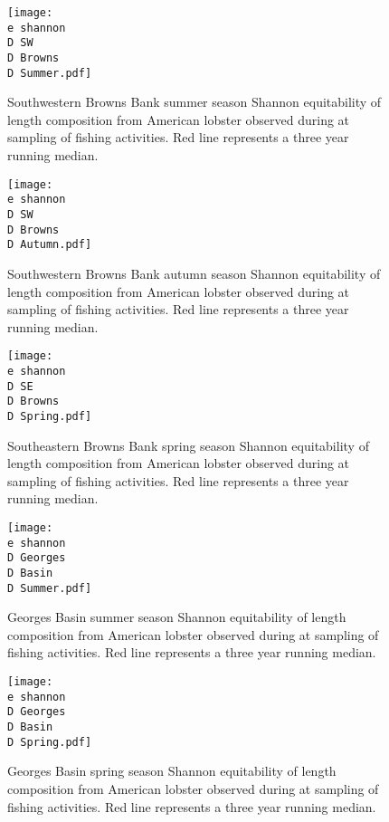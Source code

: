\documentclass[11pt]{article}
\newcommand{\D}{.}
\newcommand{\e}{/backup/bio_data/bio.lobster/figures/} %
\begin{document}
\clearpage



\begin{figure}

    \texttt{[image: \\e shannon\\D SW\\D Browns\\D Summer.pdf]}
    \caption{Southwestern Browns Bank summer season Shannon equitability of length composition from American lobster observed during at sampling of fishing activities. Red line represents a three year running median.}

\end{figure}

\begin{figure}

    \texttt{[image: \\e shannon\\D SW\\D Browns\\D Autumn.pdf]}
    \caption{Southwestern Browns Bank autumn season Shannon equitability of length composition from American lobster observed during at sampling of fishing activities. Red line represents a three year running median.}

\end{figure}

\begin{figure}

    \texttt{[image: \\e shannon\\D SE\\D Browns\\D Spring.pdf]}
    \caption{Southeastern Browns Bank spring season Shannon equitability of length composition from American lobster observed during at sampling of fishing activities. Red line represents a three year running median.}

\end{figure}

\begin{figure}

    \texttt{[image: \\e shannon\\D Georges\\D Basin\\D Summer.pdf]}
    \caption{Georges Basin summer season Shannon equitability of length composition from American lobster observed during at sampling of fishing activities. Red line represents a three year running median.}

\end{figure}

\begin{figure}

    \texttt{[image: \\e shannon\\D Georges\\D Basin\\D Spring.pdf]}
    \caption{Georges Basin spring season Shannon equitability of length composition from American lobster observed during at sampling of fishing activities. Red line represents a three year running median.}

\end{figure}
\end{document}

